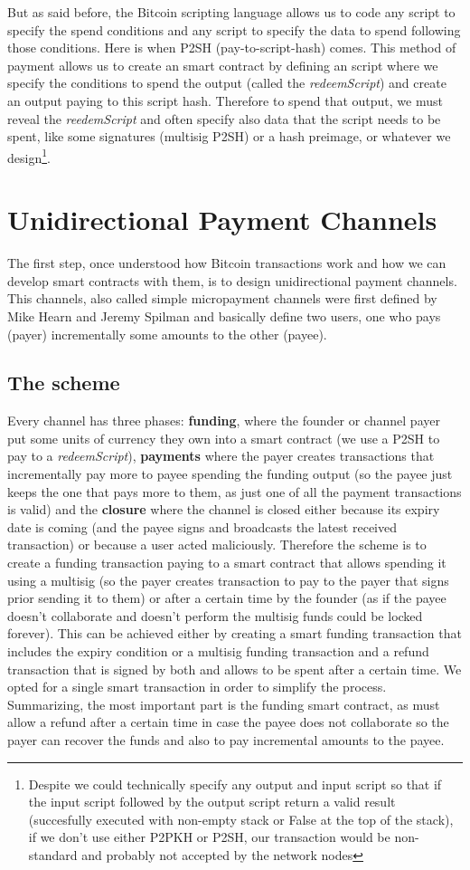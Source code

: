 \documentclass[12pt,journal,compsoc]{IEEEtran}
\begin{document}
But as said before, the Bitcoin scripting language allows us to code any script to specify the spend conditions and any script to specify the data to spend following those conditions. Here is when P2SH (pay-to-script-hash) comes. This method of payment allows us to create an smart contract by defining an script where we specify the conditions to spend the output (called the \textit{redeemScript}) and create an output paying to this script hash. Therefore to spend that output, we must reveal the \textit{reedemScript} and often specify also data that the script needs to be spent, like some signatures (multisig P2SH) or a hash preimage, or whatever we design\footnote{Despite we could technically specify any output and input script so that if the input script followed by the output script return a valid result (succesfully executed with non-empty stack or False at the top of the stack), if we don't use either P2PKH or P2SH, our transaction would be non-standard and probably not accepted by the network nodes}.
\section{Unidirectional Payment Channels}
The first step, once understood how Bitcoin transactions work and how we can develop smart contracts with them, is to design unidirectional payment channels. This channels, also called simple micropayment channels were first defined by Mike Hearn and Jeremy Spilman\cite{bitcoin-wiki-contract:online} and basically define two users, one who pays (payer) incrementally some amounts to the other (payee).
\subsection{The scheme}
Every channel has three phases: \textbf{funding}, where the founder or channel payer put some units of currency they own into a smart contract (we use a P2SH to pay to a \textit{redeemScript}), \textbf{payments} where the payer creates transactions that incrementally pay more to payee spending the funding output (so the payee just keeps the one that pays more to them, as just one of all the payment transactions is valid) and the \textbf{closure} where the channel is closed either because its expiry date is coming (and the payee signs and broadcasts the latest received transaction) or because a user acted maliciously. Therefore the scheme is to create a funding transaction paying to a smart contract that allows spending it using a multisig (so the payer creates transaction to pay to the payer that signs prior sending it to them) or after a certain time by the founder (as if the payee doesn't collaborate and doesn't perform the multisig funds could be locked forever). This can be achieved either by creating a smart funding transaction that includes the expiry condition or a multisig funding transaction and a refund transaction that is signed by both and allows to be spent after a certain time. We opted for a single smart transaction in order to simplify the process. Summarizing, the most important part is the funding smart contract, as must allow a refund after a certain time in case the payee does not collaborate so the payer can recover the funds and also to pay incremental amounts to the payee.
\end{document}
